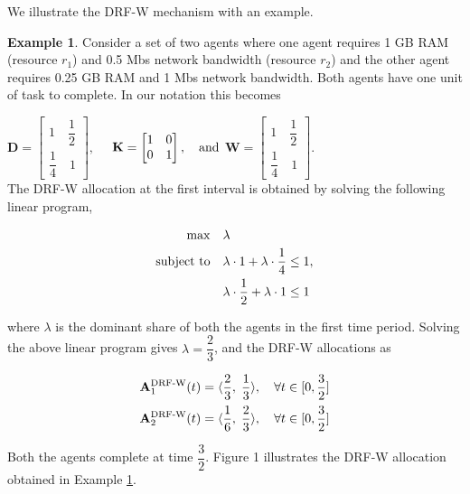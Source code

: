 \documentclass[letterpaper]{article} %
\theoremstyle{definition}
\newtheorem{example}{Example}
\begin{document}
We illustrate the DRF-W mechanism with an example. 
\begin{example} \label{drf-example}
Consider a set of two agents where one agent requires 1 GB RAM (resource $r_1$) and 0.5 Mbs network bandwidth (resource $r_2$) and the other agent requires 0.25 GB RAM and 1 Mbs network bandwidth. Both agents have one unit of task to complete. In our notation this becomes 

\noindent $\mathbf{D} = \begin{bmatrix} 1 \quad \dfrac{1}{2} \\\dfrac{1}{4} \quad 1 \end{bmatrix}, \quad$
$\mathbf{K} = \begin{bmatrix} 1 \quad 0 \\0 \quad 1 \end{bmatrix}, \quad \textnormal{and}$
$\mathbf{W} = \begin{bmatrix} 1 \quad \dfrac{1}{2} \\\dfrac{1}{4} \quad 1 \end{bmatrix}$.\\[4 pt]
The DRF-W allocation at the first interval is obtained by solving the following linear program,
\begin{linenomath}
\begin{align*} 
\begin{split}
\max \quad & \lambda  
\\ \textnormal{subject to} \quad  & \lambda \cdot 1 + \lambda \cdot \dfrac{1}{4} \leq 1, \\ &  \lambda \cdot \dfrac{1}{2} + \lambda \cdot 1 \leq 1    
\end{split}
\end{align*}
\end{linenomath}

\noindent where $\lambda$ is the dominant share of both the agents in the first time period. Solving the above linear program gives $\lambda = \displaystyle  \dfrac{2}{3}$, and the DRF-W allocations as
\begin{linenomath}
\begin{align*} 
\begin{split}
\mathbf{A}^{\textnormal{DRF-W}}_{1}(t) & = \langle \dfrac{2}{3}, \; \dfrac{1}{3}\rangle, \quad \forall t \in [0, \dfrac{3}{2}] \\[1 pt]
\mathbf{A}^{\textnormal{DRF-W}}_{2}(t) & = \langle \dfrac{1}{6}, \; \dfrac{2}{3} \rangle, \quad \forall t \in [0, \dfrac{3}{2}]  
\end{split}
\end{align*}
\end{linenomath}

\noindent Both the agents complete at time $\displaystyle \dfrac{3}{2}$. Figure 1 illustrates the DRF-W allocation obtained in Example \ref{drf-example}.
\end{example}
\end{document}
